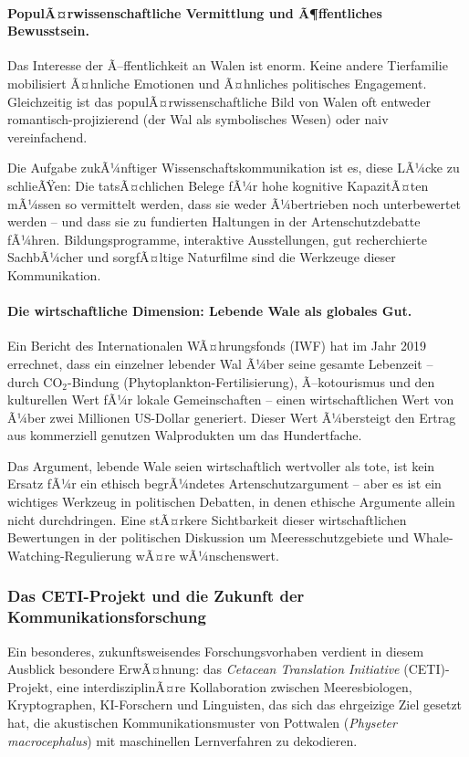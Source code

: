 ﻿\documentclass[12pt,a4paper]{article}
\theoremstyle{definition}
\theoremstyle{remark}
\begin{document}
\paragraph{PopulÃ¤rwissenschaftliche Vermittlung und Ã¶ffentliches Bewusstsein.}
Das Interesse der Ã–ffentlichkeit an Walen ist enorm. Keine andere Tierfamilie mobilisiert Ã¤hnliche Emotionen und Ã¤hnliches politisches Engagement. Gleichzeitig ist das populÃ¤rwissenschaftliche Bild von Walen oft entweder romantisch-projizierend (der Wal als symbolisches Wesen) oder naiv vereinfachend.

Die Aufgabe zukÃ¼nftiger Wissenschaftskommunikation ist es, diese LÃ¼cke zu schlieÃŸen: Die tatsÃ¤chlichen Belege fÃ¼r hohe kognitive KapazitÃ¤ten mÃ¼ssen so vermittelt werden, dass sie weder Ã¼bertrieben noch unterbewertet werden -- und dass sie zu fundierten Haltungen in der Artenschutzdebatte fÃ¼hren. Bildungsprogramme, interaktive Ausstellungen, gut recherchierte SachbÃ¼cher und sorgfÃ¤ltige Naturfilme sind die Werkzeuge dieser Kommunikation.

\paragraph{Die wirtschaftliche Dimension: Lebende Wale als globales Gut.}
Ein Bericht des Internationalen WÃ¤hrungsfonds (IWF) hat im Jahr 2019 errechnet, dass ein einzelner lebender Wal Ã¼ber seine gesamte Lebenzeit -- durch CO$_2$-Bindung (Phytoplankton-Fertilisierung), Ã–kotourismus und den kulturellen Wert fÃ¼r lokale Gemeinschaften -- einen wirtschaftlichen Wert von Ã¼ber zwei Millionen US-Dollar generiert. Dieser Wert Ã¼bersteigt den Ertrag aus kommerziell genutzen Walprodukten um das Hundertfache.

Das Argument, lebende Wale seien wirtschaftlich wertvoller als tote, ist kein Ersatz fÃ¼r ein ethisch begrÃ¼ndetes Artenschutzargument -- aber es ist ein wichtiges Werkzeug in politischen Debatten, in denen ethische Argumente allein nicht durchdringen. Eine stÃ¤rkere Sichtbarkeit dieser wirtschaftlichen Bewertungen in der politischen Diskussion um Meeresschutzgebiete und Whale-Watching-Regulierung wÃ¤re wÃ¼nschenswert.

\subsubsection{Das CETI-Projekt und die Zukunft der Kommunikationsforschung}

Ein besonderes, zukunftsweisendes Forschungsvorhaben verdient in diesem Ausblick besondere ErwÃ¤hnung: das \emph{Cetacean Translation Initiative} (CETI)-Projekt, eine interdisziplinÃ¤re Kollaboration zwischen Meeresbiologen, Kryptographen, KI-Forschern und Linguisten, das sich das ehrgeizige Ziel gesetzt hat, die akustischen Kommunikationsmuster von Pottwalen (\textit{Physeter macrocephalus}) mit maschinellen Lernverfahren zu dekodieren.
\end{document}
